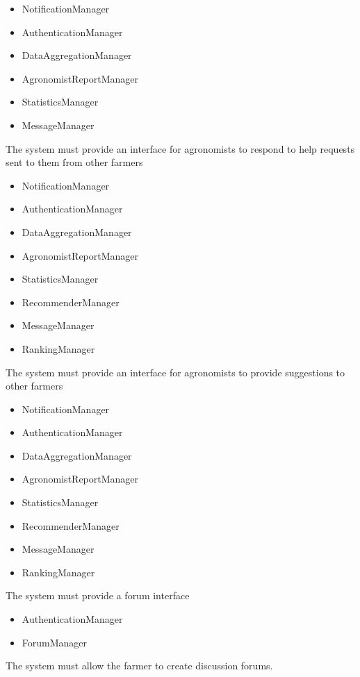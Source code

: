 \begin{itemize}
\begin{itemize}
\item NotificationManager
\item AuthenticationManager
\item DataAggregationManager
\item AgronomistReportManager
\item StatisticsManager
\item MessageManager

\end{itemize}
 The system must provide an interface for agronomists to respond to help requests sent to them from other farmers 
\begin{itemize}

\item NotificationManager
\item AuthenticationManager
\item DataAggregationManager
\item AgronomistReportManager
\item StatisticsManager
\item RecommenderManager
\item MessageManager
\item RankingManager

\end{itemize}
 The system must provide an interface for agronomists to provide suggestions to other farmers
\begin{itemize}

\item NotificationManager
\item AuthenticationManager
\item DataAggregationManager
\item AgronomistReportManager
\item StatisticsManager
\item RecommenderManager
\item MessageManager
\item RankingManager

\end{itemize}
  The system must provide a forum interface
\begin{itemize}

\item AuthenticationManager
\item ForumManager


\end{itemize}

  The system must allow the farmer to create discussion forums.


\end{itemize}
